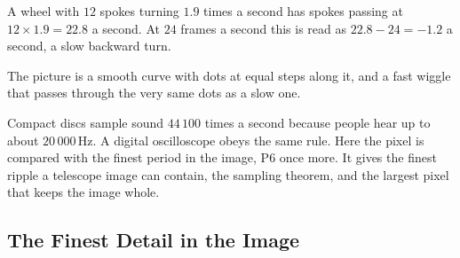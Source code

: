 A wheel with $12$ spokes turning $1.9$ times a second has spokes passing at $12\times1.9=22.8$ a second. At $24$ frames a second this is read as $22.8-24=-1.2$ a second, a slow backward turn.

The picture is a smooth curve with dots at equal steps along it, and a fast wiggle that passes through the very same dots as a slow one.

Compact discs sample sound $44\,100$ times a second because people hear up to about $20\,000\,\mathrm{Hz}$. A digital oscilloscope obeys the same rule. Here the pixel is compared with the finest period in the image, P6 once more. It gives the finest ripple a telescope image can contain, the sampling theorem, and the largest pixel that keeps the image whole.

\subsection{The Finest Detail in the Image}

